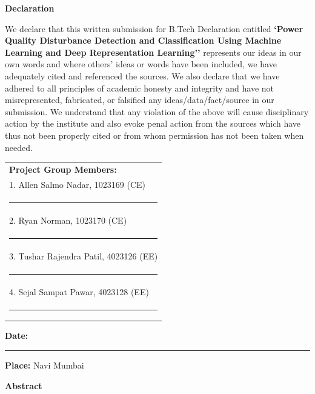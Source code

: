 \documentclass[12pt,a4paper]{report}
\begin{document}
\begin{center}
\vspace*{0.2cm}
{\LARGE\bf Declaration}\\[0.5cm]
\end{center}

\justify
We declare that this written submission for B.Tech Declaration entitled \textbf{`Power Quality Disturbance Detection and Classification Using Machine Learning and Deep Representation Learning''} represents our ideas in our own words and where others' ideas or words have been included, we have adequately cited and referenced the sources. We also declare that we have adhered to all principles of academic honesty and integrity and have not misrepresented, fabricated, or falsified any ideas/data/fact/source in our submission. We understand that any violation of the above will cause disciplinary action by the institute and also evoke penal action from the sources which have thus not been properly cited or from whom permission has not been taken when needed.

\vspace{1.5cm}
\hfill
\begin{tabular}[t]{l@{}}
{\large\textbf{Project Group Members:}} \\[0.5cm]

1. Allen Salmo Nadar, 1023169 (CE)\\[0.12cm]
\noindent\rule{6cm}{0.4pt} \\[0.65cm]

2. Ryan Norman, 1023170 (CE) \\[0.12cm]
\noindent\rule{6cm}{0.4pt} \\[0.65cm]

3. Tushar Rajendra Patil, 4023126 (EE) \\[0.12cm]
\noindent\rule{6cm}{0.4pt} \\[0.65cm]

4. Sejal Sampat Pawar, 4023128 (EE) \\[0.12cm]
\noindent\rule{6cm}{0.4pt}
\end{tabular}

\vfill
\noindent
\textbf{Date:} \rule{3.5cm}{0.4pt} \hfill \textbf{Place:} Navi Mumbai
\clearpage

\begin{center}
\vspace*{0.2cm}
{\LARGE\bf Abstract}\\[0.35cm]
\end{center}
\end{document}
